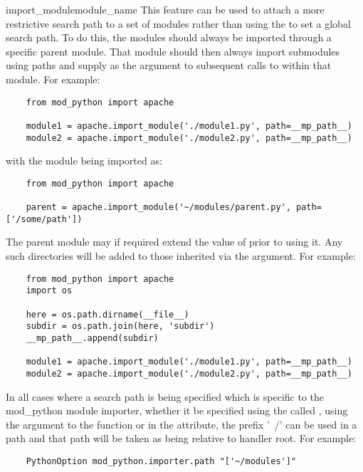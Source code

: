 \begin{funcdesc}{import_module}{module_name}
  This feature can be used to attach a more restrictive search path to a
  set of modules rather than using the  to set a global
  search path. To do this, the modules should always be imported through a
  specific parent module. That module should then always import submodules
  using paths and supply  as the  argument to
  subsequent calls to  within that module. For
  example:

  \begin{verbatim}
    from mod_python import apache

    module1 = apache.import_module('./module1.py', path=__mp_path__)
    module2 = apache.import_module('./module2.py', path=__mp_path__)
  \end{verbatim}

  with the module being imported as:

  \begin{verbatim}
    from mod_python import apache

    parent = apache.import_module('~/modules/parent.py', path=['/some/path'])
  \end{verbatim}

  The parent module may if required extend the value of 
  prior to using it. Any such directories will be added to those inherited
  via the  argument. For example:

  \begin{verbatim}
    from mod_python import apache
    import os

    here = os.path.dirname(__file__)
    subdir = os.path.join(here, 'subdir')
    __mp_path__.append(subdir)

    module1 = apache.import_module('./module1.py', path=__mp_path__)
    module2 = apache.import_module('./module2.py', path=__mp_path__)
  \end{verbatim}

  In all cases where a search path is being specified which is specific
  to the mod_python module importer, whether it be specified using the
   called , using the
   argument to the  function or
  in the  attribute, the prefix '~/' can be used in
  a path and that path will be taken as being relative to handler root.
  For example:

  \begin{verbatim}
    PythonOption mod_python.importer.path "['~/modules']"
  \end{verbatim}


\end{funcdesc}
